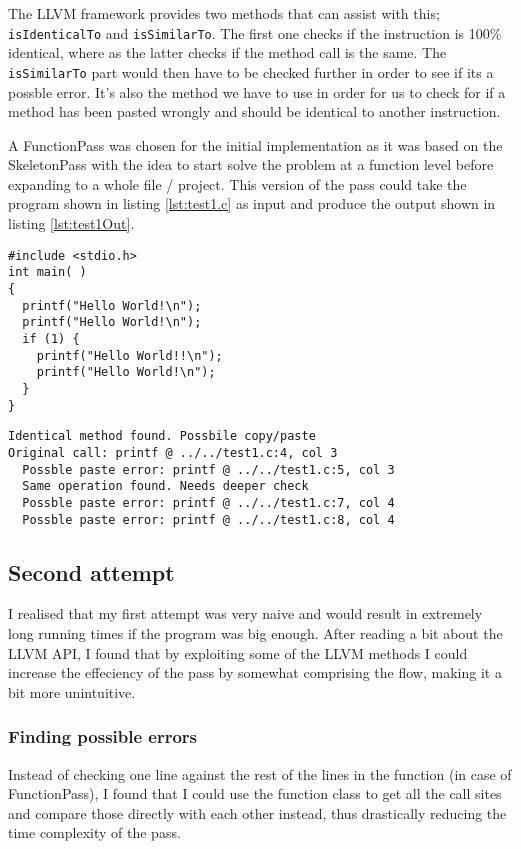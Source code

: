 \documentclass[a4paper,11pt]{article}
\theoremstyle{mytheor}
\begin{document}
The LLVM framework provides two methods that can assist with this; \verb!isIdenticalTo! and \verb!isSimilarTo!.
The first one checks if the instruction is 100\% identical, where as the latter checks if the method call is the same.
The \verb!isSimilarTo! part would then have to be checked further in order to see if its a possble error.
It's also the method we have to use in order for us to check for if a method has been pasted wrongly and should be identical to another instruction.

A FunctionPass was chosen for the initial implementation as it was based on the SkeletonPass with the idea to start solve the problem at a function level before expanding to a whole file / project.
This version of the pass could take the program shown in listing \ref{lst:test1.c} as input and produce the output shown in listing \ref{lst:test1Out}.
\begin{lstlisting}[caption={test1.c},label={lst:test1.c}]
#include <stdio.h>
int main( )
{
  printf("Hello World!\n");
  printf("Hello World!\n");
  if (1) {
    printf("Hello World!!\n");
    printf("Hello World!\n");
  }
}
\end{lstlisting}

\begin{lstlisting}[caption={Pass output for test1.c},label={lst:test1Out}]
Identical method found. Possbile copy/paste
Original call: printf @ ../../test1.c:4, col 3
  Possble paste error: printf @ ../../test1.c:5, col 3
  Same operation found. Needs deeper check
  Possble paste error: printf @ ../../test1.c:7, col 4
  Possble paste error: printf @ ../../test1.c:8, col 4
\end{lstlisting}

\subsection*{Second attempt}
I realised that my first attempt was very naive and would result in extremely long running times if the program was big enough.
After reading a bit about the LLVM API, I found that by exploiting some of the LLVM methods I could increase the effeciency of the pass by somewhat comprising the flow, making it a bit more unintuitive.

\subsubsection*{Finding possible errors}
Instead of checking one line against the rest of the lines in the function (in case of FunctionPass),
I found that I could use the function class to get all the call sites and compare those directly with each other
instead, thus drastically reducing the time complexity of the pass.
\end{document}
